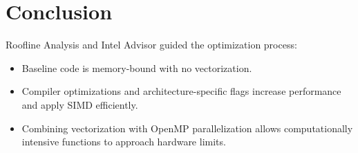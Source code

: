 \section*{Conclusion}

Roofline Analysis and Intel Advisor guided the optimization process:

\begin{itemize}
    \item Baseline code is memory-bound with no vectorization.
    \item Compiler optimizations and architecture-specific flags increase performance and apply SIMD efficiently.
    \item Combining vectorization with OpenMP parallelization allows computationally intensive functions to approach hardware limits.
\end{itemize}
